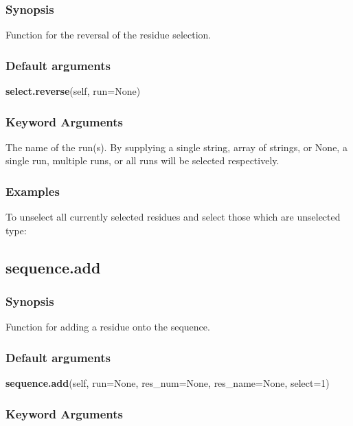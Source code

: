 \subsubsection{Synopsis}

Function for the reversal of the residue selection.

\subsubsection{Default arguments}

\textsf{\textbf{select.reverse}(self, run=None)}


\subsubsection{Keyword Arguments}

  The name of the run(s).  By supplying a single string, array of strings, or None, a single run, multiple runs, or all runs will be selected respectively.

\subsubsection{Examples}

To unselect all currently selected residues and select those which are unselected type:




\newpage

\subsection{sequence.add}


\subsubsection{Synopsis}

Function for adding a residue onto the sequence.

\subsubsection{Default arguments}

\textsf{\textbf{sequence.add}(self, run=None, res\_num=None, res\_name=None, select=1)}


\subsubsection{Keyword Arguments}


